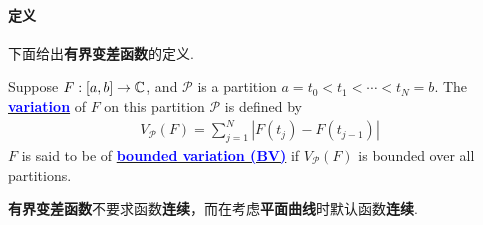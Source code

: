 \newpage
\paragraph{定义}
	下面给出\textbf{有界变差函数}的定义.
	\begin{defn}\label{def 4.4.2}
		Suppose $F : [a , b] \rightarrow \mathbb{C}$, and $\mathcal{P}$ is a partition $a = t_0 < t_1 < \cdots < t_N = b$. The \underline{\textcolor{blue}{\textbf{variation}}} of $F$ on this partition $\mathcal{P}$ is defined by
		\begin{align}
			V_{\mathcal{P}}(F) = \sum_{j = 1}^{N}{\left| F(t_j) - F(t_{j - 1}) \right|}
		\end{align}
		$F$ is said to be of \underline{\textcolor{blue}{\textbf{bounded variation (BV)}}} if $V_{\mathcal{P}}(F)$ is bounded over all partitions.
		
		\vspace{1em}
		
		\begin{rmk}
			\textbf{有界变差函数}不要求函数\textbf{连续}，而在考虑\textbf{平面曲线}时默认函数\textbf{连续}.
		\end{rmk}
	\end{defn}

